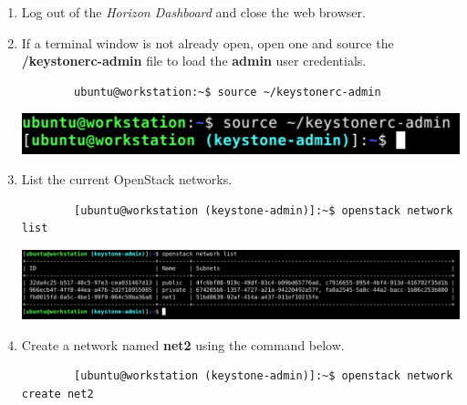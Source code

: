 \documentclass[letterpaper, 12pt]{article}
\begin{document}
\begin{enumerate}
    \item Log out of the \textit{Horizon Dashboard} and close the web browser.

    \item If a terminal window is not already open, open one and source the \textbf{\texttildemid/keystonerc-admin} file to load the \textbf{admin} user credentials.
    \begin{lstlisting}
        ubuntu@workstation:~$ source ~/keystonerc-admin
    \end{lstlisting}

    \begin{center}
        \includegraphics[width=\linewidth]{images/part3/step12.png}
    \end{center}

    \item List the current OpenStack networks.
    \begin{lstlisting}
        [ubuntu@workstation (keystone-admin)]:~$ openstack network list
    \end{lstlisting}

    \begin{center}
        \includegraphics[width=\linewidth]{images/part3/step13.png}
    \end{center}

    \item Create a network named \textbf{net2} using the command below.
    \begin{lstlisting}
        [ubuntu@workstation (keystone-admin)]:~$ openstack network create net2
    \end{lstlisting}


\end{enumerate}
\end{document}
